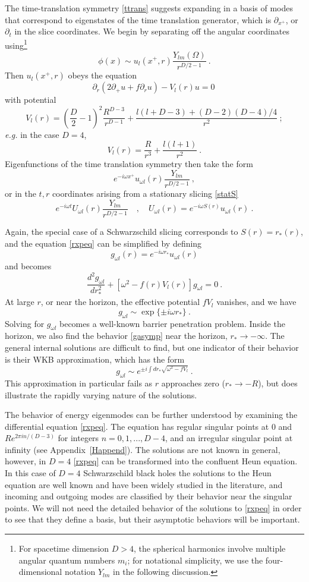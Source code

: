 \documentclass[12pt]{article}
\numberwithin{equation}{section}
\newcommand{\beq}{\begin{equation}}
\newcommand{\eeq}{\end{equation}}
\begin{document}
The time-translation symmetry \eqref{ttrans} suggests expanding in a basis of modes that correspond to eigenstates of the time translation generator, which is  $\partial_{x^+}$, or $\partial_t$ in the slice coordinates. We begin by separating off the angular coordinates using\footnote{For spacetime dimension $D>4$, the spherical harmonics involve multiple angular quantum numbers $m_i$; for notational simplicity, we use the four-dimensional notation $Y_{lm}$ in the following discussion.}
\beq\label{phisep}
\phi(x)\sim u_{l}(x^+,r) \frac{Y_{lm}(\Omega)}{r^{D/2-1}}\ .
\eeq
Then $u_{l}(x^+,r)$ obeys the equation
\beq\label{rxpeq}
\partial_r\left(2\partial_+ u + f\partial_r u\right) - V_l(r)u =0\ 
\eeq
with potential
\beq
V_l(r)= \left(\frac{D}{2}-1\right)^2 \frac{R^{D-3}}{r^{D-1}} +\frac{l(l+D-3)+(D-2)(D-4)/4}{r^{2}}\ ;
\eeq
{\it e.g.} in the case $D=4$, 
\beq\label{4dpot}
V_l(r) = \frac{R}{r^3} + \frac{l(l+1)}{r^2}\ .
\eeq
Eigenfunctions of the time translation symmetry then take the form
\beq\label{Eefcns}
e^{-i\omega x^+}u_{\omega l }(r) \frac{Y_{lm}}{r^{D/2-1}}\ ,
\eeq
or in the $t,r$ coordinates arising from a stationary slicing \eqref{statS}
\beq\label{Trsolns}
e^{-i\omega t}U_{\omega l}(r) \frac{Y_{lm}}{r^{D/2-1}}\quad ,\quad U_{\omega l}(r)= e^{-i\omega S(r)}u_{\omega l}(r)\ .
\eeq

Again, 
the special case of a Schwarzschild slicing corresponds to $S(r)=r_*(r)$, and  the equation \eqref{rxpeq} can be simplified by defining
\beq\label{rescm}
 g_{\omega l}(r)=e^{-i\omega r_*} u_{\omega l}(r)
\eeq
and becomes
\beq\label{diffeq}
\frac{d^2 g_{\omega l} }{d r_*^2}  + \left[\omega^2-f(r)V_l(r)\right] g_{\omega l} =0\ .
\eeq
At large $r$, or near the horizon, the effective potential $fV_l$ vanishes, and we have 
\beq\label{gasymp}
g_{\omega l}\sim \exp\{\pm i \omega r_*\}\ .
\eeq
Solving for $g_{\omega l}$ becomes a well-known barrier penetration problem.  Inside the horizon, we also find the behavior \eqref{gasymp} near the horizon, $r_*\rightarrow-\infty$.  The general internal solutions are difficult to find, but one indicator of their behavior is their WKB approximation, which has the form
\beq
g_{\omega l} \sim e^{\pm i \int dr_* \sqrt{\omega^2 -fV_l}}\ .
\eeq
This approximation in particular fails as $r$ approaches zero ($r_*\rightarrow-R$), but does illustrate the rapidly varying nature of the solutions.

The behavior of energy eigenmodes can be further understood by examining the differential equation \eqref{rxpeq}. The equation has regular singular points at $0$ and $R e^{2 \pi i n/ (D-3)}$ for integers $n = 0, 1,..., D-4$, and an irregular singular point at infinity (see Appendix~\ref{Happend}). The  solutions are not known in general, however, in $D=4$ \eqref{rxpeq} can be transformed into the confluent Heun equation. In this case of  $D=4$ Schwarzschild black holes the solutions to the Heun equation are well known and have been widely studied in the literature, and incoming and outgoing modes are classified by their behavior near the singular points. We will not need the detailed behavior of the solutions to  \eqref{rxpeq} in order to see that they define a basis, but their asymptotic behaviors will be important.  
\end{document}
